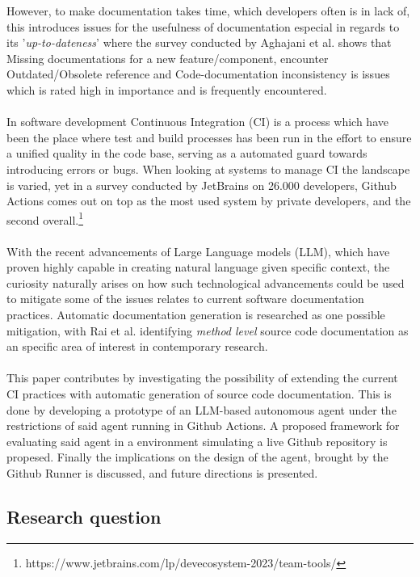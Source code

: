 However, to make documentation takes time, which developers often is in lack of, this introduces issues for the usefulness of documentation especial in regards to its '\textit{up-to-dateness}'\cite{aghajani2020software} where the survey conducted by Aghajani et al. shows that Missing documentations for a new feature/component, encounter Outdated/Obsolete reference and Code-documentation inconsistency is issues which is rated high in importance and is frequently encountered.
\\ \\
In software development Continuous Integration (CI) is a process which have been the place where test and build processes has been run in the effort to ensure a unified quality in the code base, serving as a automated guard towards introducing errors or bugs. When looking at systems to manage CI the landscape is varied, yet in a survey conducted by JetBrains on 26.000 developers, Github Actions comes out on top as the most used system by private developers, and the second overall.\footnote{https://www.jetbrains.com/lp/devecosystem-2023/team-tools/}
\\ \\
With the recent advancements of Large Language models (LLM), which have proven highly capable in creating natural language given specific context, the curiosity naturally arises on how such technological advancements could be used to mitigate some of the issues relates to current software documentation practices. Automatic documentation generation is researched as one possible mitigation, with Rai et al. identifying \textit{method level} source code documentation as an specific area of interest in contemporary research\cite{rai2022review}.
\\ \\
This paper contributes by investigating the possibility of extending the current CI practices with automatic generation of source code documentation. This is done by developing a prototype of an LLM-based autonomous agent under the restrictions of said agent running in Github Actions. A proposed framework for evaluating said agent in a environment simulating a live Github repository is propesed. Finally the implications on the design of the agent, brought by the Github Runner is discussed, and future directions is presented.

\subsection{Research question}
\researchQuestion